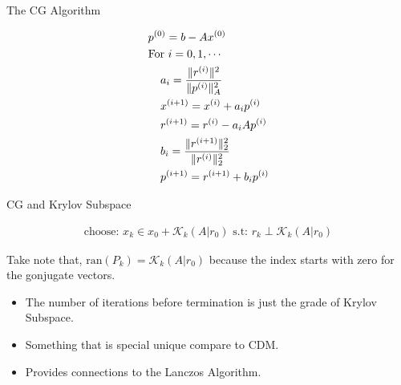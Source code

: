 \documentclass{beamer}
\begin{document}
    \begin{frame}{The CG Algorithm}
        \begin{definition}[CG]\label{def:CG}
                \begin{align}
                    & p^{(0)} = b - Ax^{(0)} 
                    \\&
                    \text{For } i = 0,1, \cdots
                    \\&\hspace{1.1em}
                    \begin{aligned}
                        & a_{i} = \frac{\Vert r^{(i)}\Vert^2}{\Vert p^{(i)}\Vert^2_A}
                        \\
                        & x^{(i + 1)} = x^{(i)} + a_i p^{(i)}
                        \\
                        & r^{(i + 1)} = r^{(i)} - a_iAp^{(i)}
                        \\
                        & b_{i} = \frac{\Vert r^{(i + 1)}\Vert_2^2}{\Vert r^{(i)}\Vert_2^2}
                        \\
                        & p^{(i + 1)} = r^{(i + 1)} + b_{i}p^{(i)}
                    \end{aligned}
                \end{align}
            \end{definition}
    \end{frame}
    \begin{frame}{CG and Krylov Subspace}
        \begin{theorem}\label{theorem:CG_and_Krylov_Subspace}
                    \begin{align}
                        \text{choose: } x_k\in x_0 + \mathcal K_{k}(A|r_0) \text{ s.t: } r_k \perp \mathcal K_{k}(A|r_0)
                    \end{align}    
        \end{theorem}
        Take note that, $\text{ran}(P_k) = \mathcal K_k(A|r_0)$ because the index starts with zero for the gonjugate vectors.
        \begin{itemize}
            \item The number of iterations before termination is just the grade of Krylov Subspace. 
            \item Something that is special unique compare to CDM. 
            \item Provides connections to the Lanczos Algorithm.
        \end{itemize}
    \end{frame}
\end{document}
